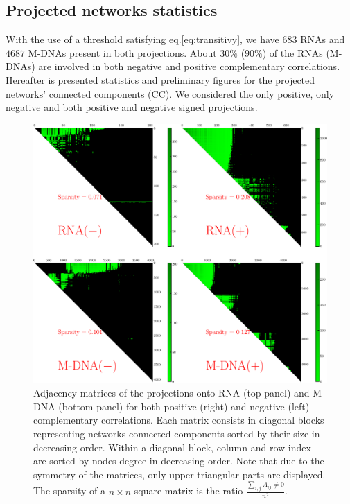 \documentclass[10pt,a4paper]{article}
\begin{document}
\subsection{Projected networks statistics}
With the use of a threshold satisfying eq.\ref{eq:transitivy}, we have $683$ RNAs and $4687$ M-DNAs present in both projections. About $30\%$ ($90\%$) of the RNAs (M-DNAs) are involved in both negative and positive complementary correlations. Hereafter is presented statistics and preliminary figures for the projected networks' connected components (CC). We considered the only positive, only negative and both positive and negative signed projections.
\begin{figure}[h!]
\centering
\includegraphics[scale=0.4]{clustered-matrices.pdf}
\caption{\label{fig:mat}Adjacency matrices of the projections onto RNA (top panel) and M-DNA (bottom panel) for both positive (right) and negative (left) complementary correlations. Each matrix consists in diagonal blocks representing networks connected components sorted by their size in decreasing order. Within a diagonal block, column and row index are sorted by nodes degree in decreasing order. Note that due to the symmetry of the matrices, only upper triangular parts are displayed. The sparsity of a $n\times n$ square matrix is the ratio $\frac{\sum_{i,j}A_{ij}\neq 0}{n^{2}}$.}
\end{figure}
\end{document}
